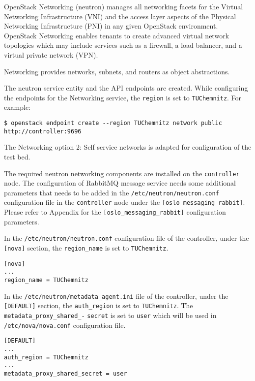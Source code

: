 OpenStack Networking (neutron) manages all networking facets for the Virtual Networking Infrastructure (VNI) and the access layer aspects of the Physical Networking Infrastructure (PNI) in any given OpenStack environment.
OpenStack Networking enables tenants to create advanced virtual network topologies which may include services such as a firewall, a load balancer, and a virtual private network (VPN).

Networking provides networks, subnets, and routers as object abstractions.

The neutron service entity and the API endpoints are created.
While configuring the endpoints for the Networking service, the \verb|region| is set to \verb|TUChemnitz|.
For example:
\begin{lstlisting}[frame=single]
$ openstack endpoint create --region TUChemnitz network public http://controller:9696
\end{lstlisting}
The Networking option 2: Self service networks is adapted for configuration of the test bed.

The required neutron networking components are installed on the \verb|controller| node.
The configuration of RabbitMQ message service needs some additional parameters that needs to be added in the \verb|/etc/neutron/neutron.conf| configuration file in the \verb|controller| node under the \verb|[oslo_messaging_rabbit]|.
\\Please refer to Appendix  for the \verb|[oslo_messaging_rabbit]| configuration parameters.


In the \verb|/etc/neutron/neutron.conf| configuration file of the controller, under the \verb|[nova]| section, the \verb|region_name| is set to \verb|TUChemnitz|.
\begin{lstlisting}[frame=single]
[nova]
...
region_name = TUChemnitz
\end{lstlisting}

In the \verb|/etc/neutron/metadata_agent.ini| file of the controller, under the \verb|[DEFAULT]| section, the \verb|auth_region| is set to \verb|TUChemnitz|.
The \verb|metadata_proxy_shared_-| \verb|secret| is set to \verb|user| which will be used in \verb|/etc/nova/nova.conf| configuration file.
\begin{lstlisting}[frame=single]
[DEFAULT]
...
auth_region = TUChemnitz
...
metadata_proxy_shared_secret = user
\end{lstlisting}

